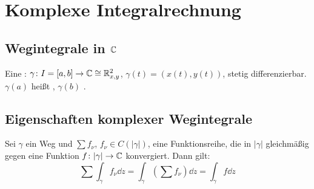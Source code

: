 \chapter{Komplexe Integralrechnung}
\section{Wegintegrale in $ \mathbb{C} $}
Eine : $ \gamma\colon I=[a,b]\rightarrow\mathbb{C}\cong\mathbb{R}^2_{x,y} $, $ \gamma(t)=(x(t),y(t)) $, stetig differenzierbar.\\
$ \gamma(a) $ hei\ss t , $ \gamma(b) $ .
\section{Eigenschaften komplexer Wegintegrale}
%
%
%
%
%
%
%
\begin{satz}
	Sei $ \gamma $ ein Weg und $ \sum f_\nu $, $ f_\nu\in C(|\gamma|) $, eine Funktionsreihe, die in $ |\gamma| $ gleichm\"a\ss ig gegen eine Funktion $ f\colon |\gamma|\rightarrow\mathbb{C} $ konvergiert. Dann gilt:
	\[ \sum\int_{\gamma}^{} f_\nu\dd z=\int_{\gamma}^{}\left(\sum f_\nu\right)\dd z=\int_{\gamma}^{} f\dd z \]
\end{satz}
